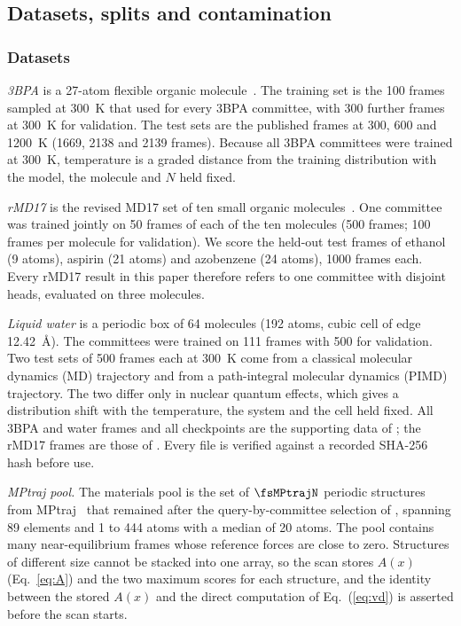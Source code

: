 \subsection{Datasets, splits and contamination}
\label{sec:data}

\subsubsection{Datasets}

\emph{3BPA} is a 27-atom flexible organic molecule~\citep{kovacs2021beyond}.
The training set is the 100 frames sampled at 300~K that \citet{beck2025committee}
used for every 3BPA committee, with 300 further frames at 300~K for validation.
The test sets are the published frames at 300, 600 and 1200~K
(1669, 2138 and 2139 frames). Because all 3BPA committees were trained at
300~K, temperature is a graded distance from the training distribution with
the model, the molecule and $N$ held fixed.

\emph{rMD17} is the revised MD17 set of ten small organic
molecules~\citep{christensen2020role}. One committee was trained jointly on 50
frames of each of the ten molecules (500 frames; 100 frames per molecule for
validation). We score the held-out test frames of ethanol (9 atoms), aspirin
(21 atoms) and azobenzene (24 atoms), 1000 frames each. Every rMD17 result in
this paper therefore refers to one committee with disjoint heads, evaluated
on three molecules.

\emph{Liquid water} is a periodic box of 64 molecules (192 atoms, cubic cell
of edge 12.42~\AA). The committees were trained on 111 frames with 500 for
validation. Two test sets of 500 frames each at 300~K come from a classical
molecular dynamics (MD) trajectory and from a path-integral molecular dynamics
(PIMD) trajectory. The two differ only in nuclear quantum effects, which gives
a distribution shift with the temperature, the system and the cell held fixed.
All 3BPA and water frames and all checkpoints are the supporting data of
\citet{beck2025committee}; the rMD17 frames are those of
\citet{christensen2020role}. Every file is verified against a recorded SHA-256
hash before use.

\emph{MPtraj pool.} The materials pool is the set of $\fsMPtrajN$ periodic
structures from MPtraj~\citep{deng2023chgnet} that remained after the
query-by-committee selection of \citet{beck2025committee}, spanning 89
elements and 1 to 444 atoms with a median of 20 atoms. The pool contains many
near-equilibrium frames whose reference forces are close to zero. Structures of
different size cannot be stacked into one array, so the scan stores
$A(x)$ (Eq.~\ref{eq:A}) and the two maximum scores for each structure, and
the identity between the stored $A(x)$ and the direct computation of
Eq.~(\ref{eq:vd}) is asserted before the scan starts.

